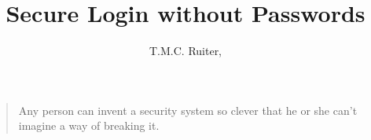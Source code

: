 \documentclass[a4paper,twoside,final]{article}
\title{Secure Login without Passwords}
\author{T.M.C. Ruiter, \XORlogo}
\begin{document}
\raggedbottom
\maketitle
\begin{quote}
Any person can invent a security system so clever that he or she can't imagine a way of breaking it.
\end{quote}
\newcommand{\includesection}[1]{\newpage}
\newcommand{\includesectionnopagebreak}[1]{}
\includesection{abstract}
\tableofcontents
\newpage
\includesection{introduction}
\includesection{general}
\includesection{keys}
\includesection{login}
\includesection{schema}
\includesection{security}
\includesection{implementation}
\includesectionnopagebreak{conclusion}


\listoftables
\end{document}
